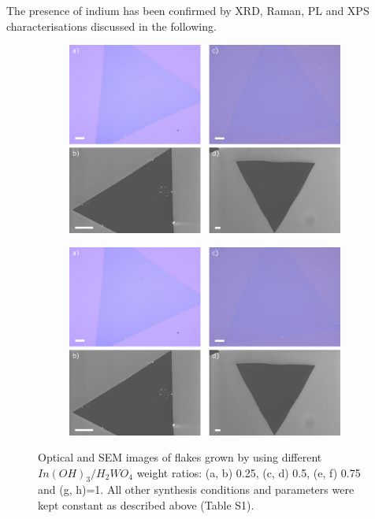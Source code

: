 The presence of indium has been confirmed by XRD, Raman, PL and XPS characterisations discussed in the following.

\begin{figure}[!ht]
	\begin{center}
		\begin{subfigure}[b]{0.7\textwidth}
			\includegraphics[width=\textwidth]{In/OMSEMImages1.png}
			\label{fig:InOMSEMImages1}
		\end{subfigure}
		\qquad
		\begin{subfigure}[b]{0.7\textwidth}
			\includegraphics[width=\textwidth]{In/OMSEMImages1.png}
			\label{fig:InOMSEMImages2}
		\end{subfigure}
		\caption{Optical and SEM images of flakes grown by using different $In(OH)_3/H_2WO_4$ weight ratios: (a, b) 0.25, (c, d) 0.5, (e, f) 0.75 and (g, h)=1. All other synthesis conditions and parameters were kept constant as described above (Table S1).}
		\label{fig:InOMSEMImages}
	\end{center}
\end{figure}

